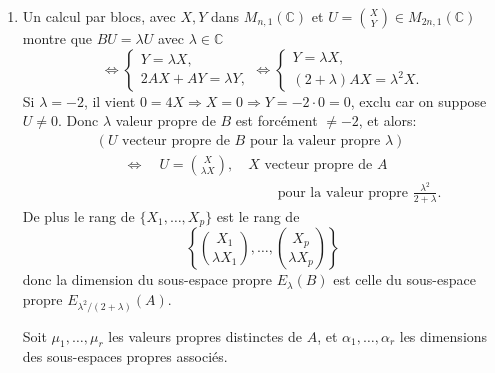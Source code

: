 \begin{enumerate}[label=\arabic*.,leftmargin=2.2em,itemsep=1.1em]
Les 2 cas $-2$ et 2 sont écartés, (ils conduisent à $\lambda=-1$ ou 1) il reste donc
\[
\cos\frac{2k\pi}{p}=-\frac12,\ 0,\ \text{ou }\frac12
\]
d'où
\[
\sin\frac{2k\pi}{p}=\pm\frac{\sqrt3}{2},\ \pm1\ \text{ou }\pm\frac{\sqrt3}{2}
\]
qui conduisent à
\[
\{\lambda,\mu\}=\left\{-\frac12+\frac{i\sqrt3}{2},-\frac12-\frac{i\sqrt3}{2}\right\}
\Rightarrow\lambda^3=\mu^3=1,
\]
\[
\{\lambda,\mu\}=\{i,-i\}\Rightarrow\lambda^4=\mu^4=1,
\]
\[
\{\lambda,\mu\}=\left\{\frac12+\frac{i\sqrt3}{2},\frac12-\frac{i\sqrt3}{2}\right\}
\Rightarrow\lambda^6=\mu^6=1.
\]
On a donc, en utilisant $A'=\begin{pmatrix}\lambda&0\\0&\mu\end{pmatrix}$ semblable (sur $\mathbb C$) à $A$ l'égalité
\[
A'^3=I\quad\text{ou}\quad A'^4=I\quad\text{ou}\quad(A')^6=I,
\]
mais si $A'=P^{-1}AP$ on a $A^k=(PA'P^{-1})^k=P(A'^k)P^{-1}$ et si $A'^k=I$ il reste $A^k=PIP^{-1}=I$.
Finalement on a toujours $A^{12}=I$.

\item Un calcul par blocs, avec $X,Y$ dans $M_{n,1}(\mathbb C)$ et $U=\binom XY\in M_{2n,1}(\mathbb C)$ montre que $BU=\lambda U$ avec $\lambda\in\mathbb C$
\[
\Longleftrightarrow
\begin{cases}Y=\lambda X,\\2AX+AY=\lambda Y,
\end{cases}
\Longleftrightarrow
\begin{cases}Y=\lambda X,\\(2+\lambda)AX=\lambda^2X.
\end{cases}
\]
Si $\lambda=-2$, il vient $0=4X\Rightarrow X=0\Rightarrow Y=-2\cdot0=0$, exclu car on suppose $U\ne0$. Donc $\lambda$ valeur propre de $B$ est forcément $\ne-2$, et alors:
\[
\begin{aligned}
& (U\text{ vecteur propre de }B\text{ pour la valeur propre }\lambda)\\
&\qquad\Longleftrightarrow\quad U=\binom{X}{\lambda X},\quad
X\text{ vecteur propre de }A\\
&\hspace{13em}\text{pour la valeur propre }\frac{\lambda^2}{2+\lambda}.
\end{aligned}
\]
De plus le rang de $\{X_1,\ldots,X_p\}$ est le rang de
\[
\left\{\binom{X_1}{\lambda X_1},\ldots,\binom{X_p}{\lambda X_p}\right\}
\]
donc la dimension du sous-espace propre $E_\lambda(B)$ est celle du sous-espace propre $E_{\lambda^2/(2+\lambda)}(A)$.

Soit $\mu_1,\ldots,\mu_r$ les valeurs propres distinctes de $A$, et $\alpha_1,\ldots,\alpha_r$ les dimensions des sous-espaces propres associés.


\end{enumerate}
